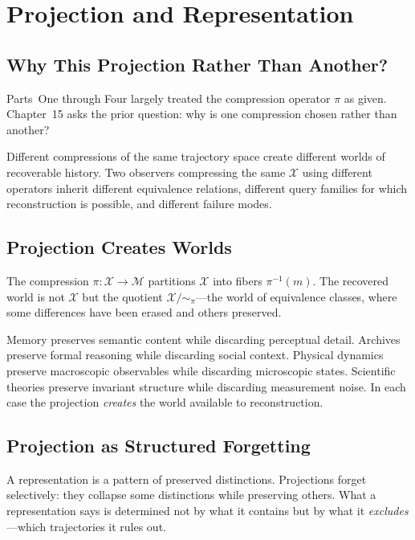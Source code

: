 \chapter{Projection and Representation}

\section{Why This Projection Rather Than Another?}

Parts~One through Four largely treated the compression operator $\pi$ as given. Chapter~15 asks the prior question: why is one compression chosen rather than another?

Different compressions of the same trajectory space create different worlds of recoverable history. Two observers compressing the same $\mathcal{X}$ using different operators inherit different equivalence relations, different query families for which reconstruction is possible, and different failure modes.

\section{Projection Creates Worlds}

The compression $\pi : \mathcal{X} \to \mathcal{M}$ partitions $\mathcal{X}$ into fibers $\pi^{-1}(m)$. The recovered world is not $\mathcal{X}$ but the quotient $\mathcal{X}/{\sim_\pi}$---the world of equivalence classes, where some differences have been erased and others preserved.

Memory preserves semantic content while discarding perceptual detail. Archives preserve formal reasoning while discarding social context. Physical dynamics preserve macroscopic observables while discarding microscopic states. Scientific theories preserve invariant structure while discarding measurement noise. In each case the projection \emph{creates} the world available to reconstruction.

\section{Projection as Structured Forgetting}

A representation is a pattern of preserved distinctions. Projections forget selectively: they collapse some distinctions while preserving others. What a representation says is determined not by what it contains but by what it \emph{excludes}---which trajectories it rules out.

